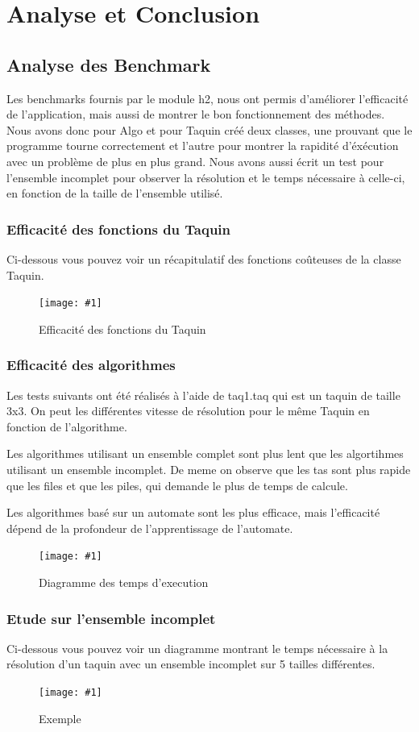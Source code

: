 ﻿\documentclass[a4paper,twoside,12pt]{report}
\newcommand{\monimage}[4]{
\par\noindent
\begin{figure}[H] %
\begin{center}
\texttt{[image: \#1]} %
\caption{#2} %
\label{#3} %
\end{center}
\end{figure} %
}
\newcommand{\ml}[0]{\par\noindent}
\begin{document}
\chapter{Analyse et Conclusion}
%
\section{Analyse des Benchmark}
%
\par
Les benchmarks fournis par le module h2, nous ont permis d'améliorer l'efficacité de l'application, mais aussi de montrer le bon fonctionnement des méthodes.
Nous avons donc pour Algo et pour Taquin créé deux classes, une prouvant que le programme tourne correctement et l'autre pour montrer la rapidité d'éxécution
avec un problème de plus en plus grand. Nous avons aussi écrit un test pour l'ensemble incomplet pour observer la résolution et le temps nécessaire à celle-ci, en
fonction de la taille de l'ensemble utilisé.
%
\subsection{Efficacité des fonctions du Taquin}
%
Ci-dessous vous pouvez voir un récapitulatif des fonctions coûteuses de la classe Taquin.
\monimage{taquinSpeed.png}{Efficacité des fonctions du Taquin}{Eff}{0.6}
%
\subsection{Efficacité des algorithmes}
Les tests suivants ont été réalisés à l'aide de taq1.taq qui est un taquin de taille 3x3. On peut les différentes vitesse de résolution pour le même Taquin en fonction de
l'algorithme.
\ml
Les algorithmes utilisant un ensemble complet sont plus lent que les algortihmes utilisant un ensemble incomplet. De meme on observe que les tas sont plus rapide que les
files et que les piles, qui demande le plus de temps de calcule.
\ml
Les algorithmes basé sur un automate sont les plus efficace, mais l'efficacité dépend de la profondeur de l'apprentissage de l'automate.
\monimage{algoSpeed.png}{Diagramme des temps d'execution}{tempsExec}{0.6}

\subsection{Etude sur l'ensemble incomplet}
Ci-dessous vous pouvez voir un diagramme montrant le temps nécessaire à la résolution d'un taquin avec un ensemble incomplet sur 5 tailles différentes.
\monimage{ensembleincomplettest2.pdf}{Exemple}{EX}{0.6}
\end{document}
